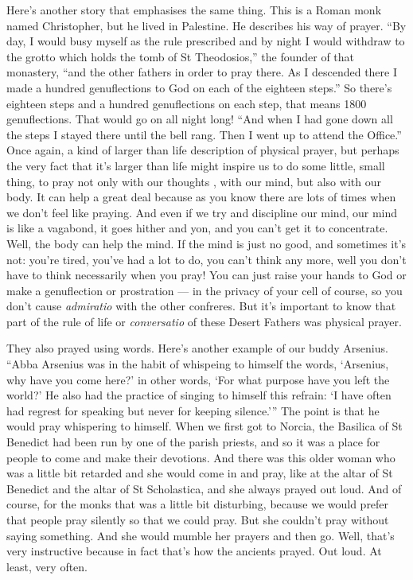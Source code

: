 Here's another story that emphasises the same thing. This is a Roman monk named Christopher, but he lived in Palestine. He describes his way of prayer. ``By day, I would busy myself as the rule prescribed and by night I would withdraw to the grotto which holds the tomb of St Theodosios,'' the founder of that monastery, ``and the other fathers in order to pray there. As I descended there I made a hundred genuflections to God on each of the eighteen steps.'' So there's eighteen steps and a hundred genuflections on each step, that means 1800 genuflections. That would go on all night long! ``And when I had gone down all the steps I stayed there until the bell rang. Then I went up to attend the Office.'' Once again, a kind of larger than life description of physical prayer, but perhaps the very fact that it's larger than life might inspire us to do some little, small thing, to pray not only with our thoughts , with our mind, but also with our body. It can help a great deal because as you know there are lots of times when we don't feel like praying. And even if we try and discipline our mind, our mind is like a vagabond, it goes hither and yon, and you can't get it to concentrate. Well, the body can help the mind. If the mind is just no good, and sometimes it's not: you're tired, you've had a lot to do, you can't think any more, well you don't have to think necessarily when you pray! You can just raise your hands to God or make a genuflection or prostration --- in the privacy of your cell of course, so you don't cause \emph{admiratio} with the other confreres. But it's important to know that part of the rule of life or \emph{conversatio} of these Desert Fathers was physical prayer.

They also prayed using words. Here's another example of our buddy Arsenius. ``Abba Arsenius was in the habit of whispeing to himself the words, `Arsenius, why have you come here?' in other words, `For what purpose have you left the world?' He also had the practice of singing to himself this refrain: `I have often had regrest for speaking but never for keeping silence.''' The point is that he would pray whispering to himself. When we first got to Norcia, the Basilica of St Benedict had been run by one of the parish priests, and so it was a place for people to come and make their devotions. And there was this older woman who was a little bit retarded and she would come in and pray, like at the altar of St Benedict and the altar of St Scholastica, and she always prayed out loud. And of course, for the monks that was a little bit disturbing, because we would prefer that people pray silently so that we could pray. But she couldn't pray without saying something. And she would mumble her prayers and then go. Well, that's very instructive because in fact that's how the ancients prayed. Out loud. At least, very often.

